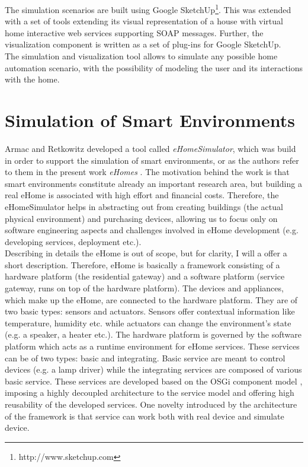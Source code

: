 The simulation scenarios are built using Google SketchUp\footnote{http://www.sketchup.com}. This was extended with a set of tools extending its visual representation of a house with virtual home interactive web services supporting SOAP messages. Further, the visualization component is written as a set of plug-ins for Google SketchUp.\\

The simulation and visualization tool allows to simulate any possible home automation scenario, with the possibility of modeling the user and its interactions with the home.

\section{Simulation of Smart Environments}\label{sec:sim_of_smart_envs}

Armac and Retkowitz developed a tool called \emph{eHomeSimulator}, which was build in order to support the simulation of smart environments, or as the authors refer to them in the present work \emph{eHomes} \cite{armac2007simulation}. The motivation behind the work is that smart environments constitute already an important research area, but building a real eHome is associated with high effort and financial costs. Therefore, the eHomeSimulator helps in abstracting out from creating buildings (the actual physical environment) and purchasing devices, allowing us to focus only on software engineering aspects and challenges involved in eHome development (e.g. developing services, deployment etc.).\\

Describing in details the eHome is out of scope, but for clarity, I will a offer a short description. Therefore, eHome is basically a framework consisting of a hardware platform (the residential gateway) and a software platform (service gateway, runs on top of the hardware platform). The devices and appliances, which make up the eHome, are connected to the hardware platform. They are of two basic types: sensors and actuators. Sensors offer contextual information like temperature, humidity etc. while actuators can change the environment's state (e.g. a speaker, a heater etc.). The hardware platform is governed by the software platform which acts as a runtime environment for eHome services. These services can be of two types: basic and integrating. Basic service are meant to control devices (e.g. a lamp driver) while the integrating services are composed of various basic service. These services are developed based on the OSGi component model \cite{allianceosgi}, imposing a highly decoupled architecture to the service model and offering high reusability of the developed services. One novelty introduced by the architecture of the framework is that service can work both with real device and simulate device.\\

